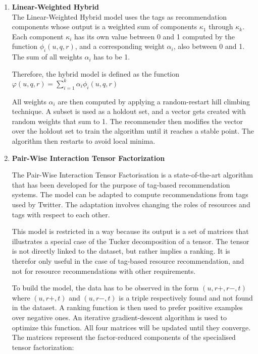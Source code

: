\documentclass{article}
\begin{document}
\begin{enumerate}
\item \textbf{Linear-Weighted Hybrid}\\

The Linear-Weighted Hybrid model uses the tags as recommendation components whose output is a weighted sum of components $\kappa_1$ through $\kappa_k$. 
Each component $\kappa_i$ has its own value between 0 and 1 computed by the function $\phi_i (u,q,r)$, and a corresponding weight $\alpha_i$, also between
0 and 1. The sum of all weights $\alpha_i$ has to be 1.

Therefore, the hybrid model is defined as the function $\varphi (u, q, r) = \sum\limits_{i = 1}^k \alpha_i \phi_i (u,q,r)$

All weights $\alpha_i$ are then computed by applying a random-restart hill climbing technique. A subset is used as a holdout set, and a vector gets created with random weights that sum to 1. The recommender then modifies the vector over the holdout set to train the algorithm until it reaches a stable point. The algorithm then restarts to avoid local minima.

\item \textbf{Pair-Wise Interaction Tensor Factorization} 

The Pair-Wise Interaction Tensor Factorisation is a state-of-the-art algorithm that has been developed for the purpose of tag-based recommendation systems. The model can be adapted to compute recommendations from tags used by Twitter. The adaptation involves changing the roles of resources and tags with respect to each other.
	
This model is restricted in a way because its output is a set of matrices that illustrates a special case of the Tucker decomposition of a tensor. The tensor is not directly linked to the dataset, but rather implies a ranking. It is therefor only useful in the case of tag-based resource recommendation, and not for resource recommendations with other requirements.
	
To build the model, the data has to be observed in the form $(u, r+, r-, t)$ where $(u, r+, t)$ and $(u, r-, t)$ is a triple respectively
found and not found in the dataset. A ranking function is then used to prefer positive examples over negative ones. An iterative gradient-descent
algorithm is used to optimize this function. All four matrices will be updated until they converge. The matrices represent the factor-reduced components
of the specialised tensor factorization:


\end{enumerate}
\end{document}
